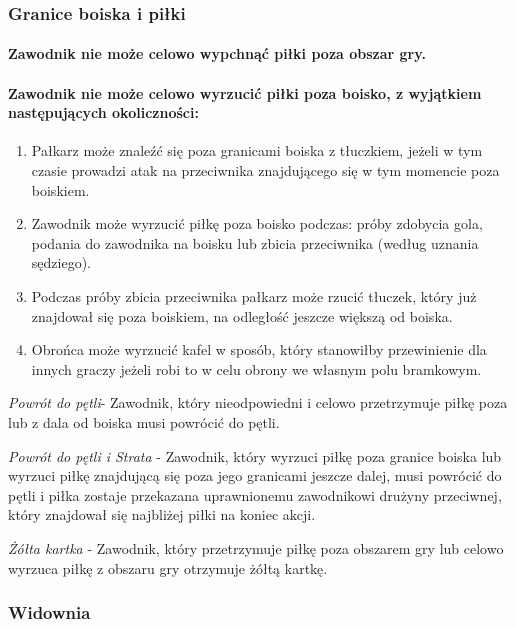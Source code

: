 \documentclass[12pt]{article}
\begin{document}
\subsubsection{Granice boiska i piłki}

\paragraph{Zawodnik nie może celowo wypchnąć piłki poza obszar gry.}

\paragraph{Zawodnik nie może celowo wyrzucić piłki poza boisko, z
	wyjątkiem następujących okoliczności:}

\begin{enumerate}
	\item
	      Pałkarz może znaleźć się poza granicami boiska z tłuczkiem, jeżeli w
	      tym czasie prowadzi atak na przeciwnika znajdującego się w tym
	      momencie poza boiskiem.
	\item
	      Zawodnik może wyrzucić piłkę poza boisko podczas: próby zdobycia gola,
	      podania do zawodnika na boisku lub zbicia przeciwnika (według uznania
	      sędziego).
	\item
	      Podczas próby zbicia przeciwnika pałkarz może rzucić tłuczek, który
	      już znajdował się poza boiskiem, na odległość jeszcze większą od
	      boiska.
	\item
	      Obrońca może wyrzucić kafel w sposób, który stanowiłby przewinienie
	      dla innych graczy jeżeli robi to w celu obrony we własnym polu
	      bramkowym.
\end{enumerate}

\emph{Powrót do pętli}- Zawodnik, który nieodpowiedni i celowo
przetrzymuje piłkę poza lub z dala od boiska musi powrócić do pętli.

\emph{Powrót do pętli i Strata} - Zawodnik, który wyrzuci piłkę poza
granice boiska lub wyrzuci piłkę znajdującą się poza jego granicami
jeszcze dalej, musi powrócić do pętli i piłka zostaje przekazana
uprawnionemu zawodnikowi drużyny przeciwnej, który znajdował się
najbliżej piłki na koniec akcji.

\emph{Żółta kartka} - Zawodnik, który przetrzymuje piłkę poza obszarem
gry lub celowo wyrzuca piłkę z obszaru gry otrzymuje żółtą kartkę.

\subsubsection{Widownia}
\end{document}
